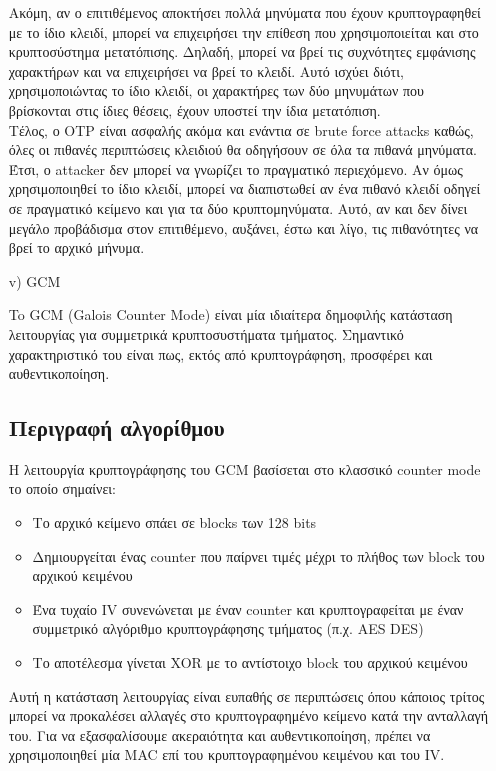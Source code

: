 \documentclass[a4paper, 11pt]{article}
\newcommand{\lt}{\latintext}
\begin{document}
\begin{itemize}
	Ακόμη, αν ο επιτιθέμενος αποκτήσει πολλά μηνύματα που έχουν κρυπτογραφηθεί με το ίδιο κλειδί, μπορεί να επιχειρήσει την επίθεση που χρησιμοποιείται και στο κρυπτοσύστημα μετατόπισης. Δηλαδή, μπορεί να βρεί τις συχνότητες εμφάνισης χαρακτήρων και να επιχειρήσει να βρεί το κλειδί. Αυτό ισχύει διότι, χρησιμοποιώντας το ίδιο κλειδί, οι χαρακτήρες των δύο μηνυμάτων που βρίσκονται στις ίδιες θέσεις, έχουν υποστεί την ίδια μετατόπιση.\\

	Τέλος, ο {\lt OTP} είναι ασφαλής ακόμα και ενάντια σε {\lt brute force attacks} καθώς, όλες οι πιθανές περιπτώσεις κλειδιού θα οδηγήσουν σε όλα τα πιθανά μηνύματα. Έτσι, ο {\lt attacker} δεν μπορεί να γνωρίζει το πραγματικό περιεχόμενο. Αν όμως χρησιμοποιηθεί το ίδιο κλειδί, μπορεί να διαπιστωθεί αν ένα πιθανό κλειδί οδηγεί σε πραγματικό κείμενο και για τα δύο κρυπτομηνύματα. Αυτό, αν και δεν δίνει μεγάλο προβάδισμα στον επιτιθέμενο, αυξάνει, έστω και λίγο, τις πιθανότητες να βρεί το αρχικό μήνυμα.

	\item[{\lt v)}] {\lt GCM}

	To {\lt GCM (Galois Counter Mode)} είναι μία ιδιαίτερα δημοφιλής κατάσταση λειτουργίας για συμμετρικά κρυπτοσυστήματα τμήματος. Σημαντικό χαρακτηριστικό του είναι πως, εκτός από κρυπτογράφηση, προσφέρει και αυθεντικοποίηση. \\

	\subsection*{Περιγραφή αλγορίθμου}
	Η λειτουργία κρυπτογράφησης του {\lt GCM} βασίσεται στο κλασσικό {\lt counter mode} το οποίο σημαίνει:
	\begin{itemize}
		\item Το αρχικό κείμενο σπάει σε {\lt blocks} των 128 {\lt bits}
		\item Δημιουργείται ένας {\lt counter} που παίρνει τιμές μέχρι το πλήθος των {\lt block} του αρχικού κειμένου
		\item Ένα τυχαίο {\lt IV} συνενώνεται με έναν {\lt counter} και κρυπτογραφείται με έναν συμμετρικό αλγόριθμο κρυπτογράφησης τμήματος (π.χ. {\lt AES DES})
		\item Tο αποτέλεσμα γίνεται {\lt XOR} με το αντίστοιχο {\lt block} του αρχικού κειμένου
	\end{itemize}

	Αυτή η κατάσταση λειτουργίας είναι ευπαθής σε περιπτώσεις όπου κάποιος τρίτος μπορεί να προκαλέσει αλλαγές στο κρυπτογραφημένο κείμενο κατά την ανταλλαγή του. Για να εξασφαλίσουμε ακεραιότητα και αυθεντικοποίηση, πρέπει να χρησιμοποιηθεί μία {\lt MAC} επί του κρυπτογραφημένου κειμένου και του {\lt IV}.


\end{itemize}
\end{document}
